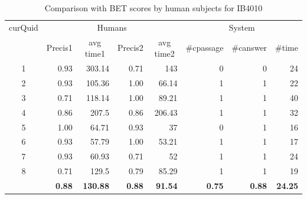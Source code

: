 \documentclass[10pt,a4paper]{article}
\numberwithin{algorithm}{section}  %
\begin{document}
\begin{table}[htb!]
\scriptsize
\caption{Comparison with BET scores by human subjects for IB4010}
\begin{tabular}{|c|r|r|r|r|r|r|r|}
\hline
\multicolumn{ 1}{|c|}{curQuid} & \multicolumn{ 4}{c|}{Humans} & \multicolumn{ 3}{c|}{System} \\ \cline{ 2- 8}
\multicolumn{ 1}{|l|}{} & \multicolumn{1}{c|}{Precis1} & \multicolumn{1}{c|}{avg time1} & \multicolumn{1}{c|}{Precis2} & \multicolumn{1}{c|}{avg time2} & \multicolumn{1}{c|}{\#cpassage} & \multicolumn{1}{c|}{\#canswer} & \multicolumn{1}{c|}{\#time } \\ \hline
1 & 0.93 & 303.14 & 0.71 & 143 & 0 & 0 & 24 \\ \hline
2 & 0.93 & 105.36 & 1.00 & 66.14 & 1 & 1 & 22 \\ \hline
3 & 0.71 & 118.14 & 1.00 & 89.21 & 1 & 1 & 40 \\ \hline
4 & 0.86 & 207.5 & 0.86 & 206.43 & 1 & 1 & 32 \\ \hline
5 & 1.00 & 64.71 & 0.93 & 37 & 0 & 1 & 16 \\ \hline
6 & 0.93 & 57.79 & 1.00 & 53.21 & 1 & 1 & 17 \\ \hline
7 & 0.93 & 60.93 & 0.71 & 52 & 1 & 1 & 24 \\ \hline
8 & 0.71 & 129.5 & 0.79 & 85.29 & 1 & 1 & 19 \\ \hline
\multicolumn{1}{|l|}{} & \textbf{0.88} & \textbf{130.88} & \textbf{0.88} & \textbf{91.54} & \textbf{0.75} & \textbf{0.88} & \textbf{24.25} \\ \hline
\end{tabular}
\label{table: BET scores for IB4010}
\end{table}

 
\end{document}
